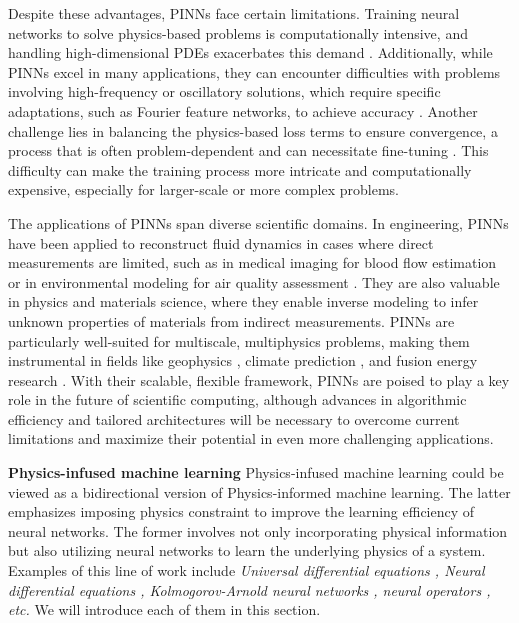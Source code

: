 Despite these advantages, PINNs face certain limitations. Training neural networks to solve physics-based problems is computationally intensive, and handling high-dimensional PDEs exacerbates this demand \cite{karniadakis2021physics}. Additionally, while PINNs excel in many applications, they can encounter difficulties with problems involving high-frequency or oscillatory solutions, which require specific adaptations, such as Fourier feature networks, to achieve accuracy \cite{karniadakis2021physics}. Another challenge lies in balancing the physics-based loss terms to ensure convergence, a process that is often problem-dependent and can necessitate fine-tuning \cite{karniadakis2021physics}. This difficulty can make the training process more intricate and computationally expensive, especially for larger-scale or more complex problems.

The applications of PINNs span diverse scientific domains. In engineering, PINNs have been applied to reconstruct fluid dynamics in cases where direct measurements are limited, such as in medical imaging for blood flow estimation \cite{kissas2020machine} or in environmental modeling for air quality assessment \cite{hettige2024airphynet}. They are also valuable in physics and materials science, where they enable inverse modeling to infer unknown properties of materials from indirect measurements. PINNs are particularly well-suited for multiscale, multiphysics problems, making them instrumental in fields like geophysics \cite{zhu2021general}, climate prediction \cite{verma2024climode}, and fusion energy research \cite{mcdevitt2024physics}. With their scalable, flexible framework, PINNs are poised to play a key role in the future of scientific computing, although advances in algorithmic efficiency and tailored architectures will be necessary to overcome current limitations and maximize their potential in even more challenging applications.

{\Large \textbf{Physics-infused machine learning}}
Physics-infused machine learning could be viewed as a bidirectional version of Physics-informed machine learning. The latter emphasizes imposing physics constraint to improve the learning efficiency of neural networks. The former involves not only incorporating physical information but also utilizing neural networks to learn the underlying physics of a system. Examples of this line of work include \textit{Universal differential equations \cite{rackauckas2020universal}, Neural differential equations \cite{kidger2022on}, Kolmogorov-Arnold neural networks \cite{liu2024kan}, neural operators \cite{li2021fourier}, etc.} We will introduce each of them in this section.

